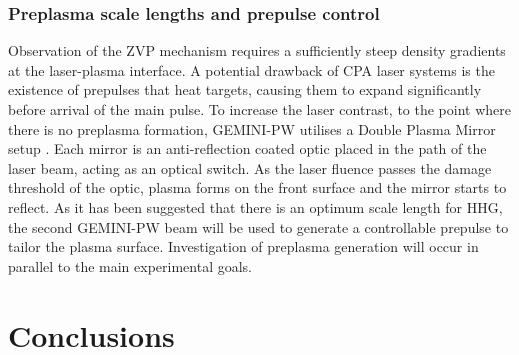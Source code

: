 \subsubsection{Preplasma scale lengths and prepulse control}
Observation of the ZVP mechanism requires a sufficiently steep density gradients at the laser-plasma interface. A potential drawback of \ac{CPA} laser systems is the existence of prepulses that heat targets, causing them to expand significantly before arrival of the main pulse. To increase the laser contrast, to the point where there is no preplasma formation, GEMINI-PW utilises a Double Plasma Mirror setup \cite{doumyCompleteCharacterizationPlasma2004}. Each mirror is an anti-reflection coated optic placed in the path of the laser beam, acting as an optical switch. As the laser fluence passes the damage threshold of the optic, plasma forms on the front surface and the mirror starts to reflect. As it has been suggested that there is an optimum scale length for \ac{HHG}, the second GEMINI-PW beam will be used to generate a controllable prepulse to tailor the plasma surface. Investigation of preplasma generation will occur in parallel to the main experimental goals.


\section{Conclusions}

